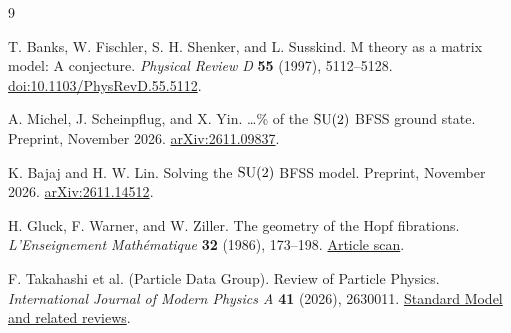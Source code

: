\begin{thebibliography}{9}
T. Banks, W. Fischler, S. H. Shenker, and L. Susskind.
\newblock M theory as a matrix model: A conjecture.
\newblock \emph{Physical Review D} \textbf{55} (1997), 5112--5128.
\newblock \href{https://doi.org/10.1103/PhysRevD.55.5112}{doi:10.1103/PhysRevD.55.5112}.

A. Michel, J. Scheinpflug, and X. Yin.
\ldots\% of the $\operatorname{SU}(2)$ BFSS ground state.
\newblock Preprint, November 2026.
\newblock \href{https://arxiv.org/abs/2611.09837}{arXiv:2611.09837}.

K. Bajaj and H. W. Lin.
\newblock Solving the $\operatorname{SU}(2)$ BFSS model.
\newblock Preprint, November 2026.
\newblock \href{https://arxiv.org/abs/2611.14512}{arXiv:2611.14512}.

H. Gluck, F. Warner, and W. Ziller.
\newblock The geometry of the Hopf fibrations.
\newblock \emph{L'Enseignement Mathématique} \textbf{32} (1986), 173--198.
\newblock \href{https://ncatlab.org/nlab/files/GluckWarnerZiller-HopfFibrations.pdf}{Article scan}.

F. Takahashi et al. (Particle Data Group).
\newblock Review of Particle Physics.
\newblock \emph{International Journal of Modern Physics A} \textbf{41} (2026), 2630011.
\newblock \href{https://pdg.lbl.gov/2026/reviews/standard_model_and_related.html}{Standard Model and related reviews}.
\end{thebibliography}
